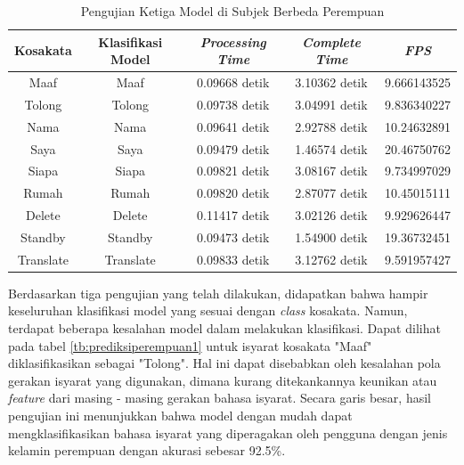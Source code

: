 \begin{longtable}{|c|c|c|c|c|}
  \caption{Pengujian Ketiga Model di Subjek Berbeda Perempuan}
  \label{tb:prediksiperempuan3}                                   \\
  \hline
  \rowcolor[HTML]{C0C0C0}
  \textbf{Kosakata} & \textbf{Klasifikasi Model} & \textbf{\emph{Processing Time}} & \textbf{\emph{Complete Time}} & \textbf{\emph{FPS}}\\
  \hline
  Maaf              & Maaf                          & 0.09668 detik                           & 3.10362 detik                                  & 9.666143525\\
  Tolong            & Tolong                        & 0.09738 detik                           & 3.04991 detik                                  & 9.836340227\\
  Nama              & Nama                          & 0.09641 detik                           & 2.92788 detik                                  & 10.24632891\\
  Saya              & Saya                          & 0.09479 detik                           & 1.46574 detik                                  & 20.46750762\\
  Siapa             & Siapa                         & 0.09821 detik                           & 3.08167 detik                                  & 9.734997029\\
  Rumah             & Rumah                         & 0.09820 detik                           & 2.87077 detik                                  & 10.45015111\\
  Delete            & Delete                        & 0.11417 detik                           & 3.02126 detik                                  & 9.929626447\\
  Standby           & Standby                       & 0.09473 detik                           & 1.54900 detik                                  & 19.36732451\\
  Translate         & Translate                     & 0.09833 detik                           & 3.12762 detik                                  & 9.591957427\\
  \hline
\end{longtable}



Berdasarkan tiga pengujian yang telah dilakukan, didapatkan bahwa hampir keseluruhan klasifikasi model yang sesuai dengan \emph{class} kosakata. Namun, terdapat beberapa kesalahan model dalam melakukan klasifikasi. Dapat dilihat pada tabel \ref{tb:prediksiperempuan1} untuk isyarat kosakata "Maaf" diklasifikasikan sebagai "Tolong". Hal ini dapat disebabkan oleh kesalahan pola gerakan isyarat yang digunakan, dimana kurang ditekankannya keunikan atau \emph{feature} dari masing - masing gerakan bahasa isyarat.  Secara garis besar, hasil pengujian ini menunjukkan bahwa model dengan mudah dapat mengklasifikasikan bahasa isyarat yang diperagakan oleh pengguna dengan jenis kelamin perempuan dengan akurasi sebesar 92.5\%. 

